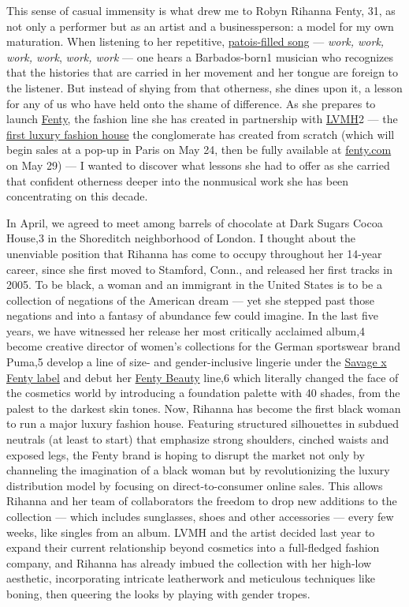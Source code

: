 This sense of casual immensity is what drew me to Robyn Rihanna Fenty,
31, as not only a performer but as an artist and a businessperson: a
model for my own maturation. When listening to her repetitive,
\href{https://www.youtube.com/watch?v=HL1UzIK-flA}{patois-filled song}
--- \emph{work, work, work, work}, \emph{work, work} --- one hears a
Barbados-born1 musician who recognizes that the histories that are
carried in her movement and her tongue are foreign to the listener. But
instead of shying from that otherness, she dines upon it, a lesson for
any of us who have held onto the shame of difference. As she prepares to
launch \href{https://www.fenty.com/}{Fenty}, the fashion line she has
created in partnership with \href{https://www.lvmh.com/}{LVMH}2 --- the
\href{https://www.nytimes3xbfgragh.onion/2019/05/10/fashion/rihanna-lvmh-fenty.html}{first
luxury fashion house} the conglomerate has created from scratch (which
will begin sales at a pop-up in Paris on May 24, then be fully available
at \href{http://fenty.com/}{fenty.com} on May 29) --- I wanted to
discover what lessons she had to offer as she carried that confident
otherness deeper into the nonmusical work she has been concentrating on
this decade.

In April, we agreed to meet among barrels of chocolate at Dark Sugars
Cocoa House,3 in the Shoreditch neighborhood of London. I thought about
the unenviable position that Rihanna has come to occupy throughout her
14-year career, since she first moved to Stamford, Conn., and released
her first tracks in 2005. To be black, a woman and an immigrant in the
United States is to be a collection of negations of the American dream
--- yet she stepped past those negations and into a fantasy of abundance
few could imagine. In the last five years, we have witnessed her release
her most critically acclaimed album,4 become creative director of
women's collections for the German sportswear brand Puma,5 develop a
line of size- and gender-inclusive lingerie under the
\href{https://www.savagex.com/}{Savage x Fenty label} and debut her
\href{https://www.fentybeauty.com/}{Fenty Beauty} line,6 which literally
changed the face of the cosmetics world by introducing a foundation
palette with 40 shades, from the palest to the darkest skin tones. Now,
Rihanna has become the first black woman to run a major luxury fashion
house. Featuring structured silhouettes in subdued neutrals (at least to
start) that emphasize strong shoulders, cinched waists and exposed legs,
the Fenty brand is hoping to disrupt the market not only by channeling
the imagination of a black woman but by revolutionizing the luxury
distribution model by focusing on direct-to-consumer online sales. This
allows Rihanna and her team of collaborators the freedom to drop new
additions to the collection --- which includes sunglasses, shoes and
other accessories --- every few weeks, like singles from an album. LVMH
and the artist decided last year to expand their current relationship
beyond cosmetics into a full-fledged fashion company, and Rihanna has
already imbued the collection with her high-low aesthetic, incorporating
intricate leatherwork and meticulous techniques like boning, then
queering the looks by playing with gender tropes.

